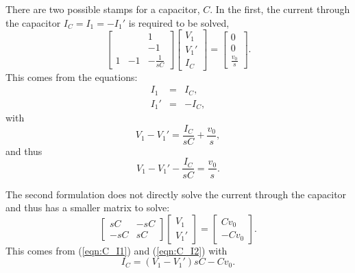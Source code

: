 \documentclass[a4paper, 12pt]{article}
\newcommand{\encp}[1]{\left(#1\right)}
\newcommand{\refeqn}[1]{\mbox{(\ref{eqn:#1})}}
\begin{document}
There are two possible stamps for a capacitor, $C$.  In the first,
the current through the capacitor $I_C=I_1=-I_1'$ is required to be solved,
%
\begin{equation}
  \begin{bmatrix}
     &  & 1 \\
     &  & -1 \\
1 & -1 & -\frac{1}{sC}
  \end{bmatrix}
  \begin{bmatrix}
    V_1 \\ V_1' \\ I_C
  \end{bmatrix}
=
\begin{bmatrix}
  0 \\ 0 \\ \frac{v_0}{s}
\end{bmatrix}.
\end{equation}
%
This comes from the equations:
%
\begin{eqnarray}
\label{eqn:C_I1}
  I_1 & = & I_C, \\
  I_1' & = & -I_C,
\label{eqn:C_I2}
\end{eqnarray}
%
with
%
\begin{equation}
    V_1 - V_1'  =  \frac{I_C}{sC} + \frac{v_0}{s},
\end{equation}
%
and thus
%
\begin{equation}
    V_1 - V_1' - \frac{I_C}{sC} =  \frac{v_0}{s}.
\end{equation}


The second formulation does not directly solve the current through the
capacitor and thus has a smaller matrix to solve:
%
\begin{equation}
  \begin{bmatrix}
    sC & -sC \\
   -sC & sC
  \end{bmatrix}
  \begin{bmatrix}
    V_1 \\ V_1'
  \end{bmatrix}
=
\begin{bmatrix}
  C v_0 \\ -C v_0
\end{bmatrix}.
\end{equation}
%
This comes from \refeqn{C_I1} and \refeqn{C_I2} with
%
\begin{equation}
    I_C  =  \encp{V_1 - V_1'}sC - C v_0.
\end{equation}
\end{document}

